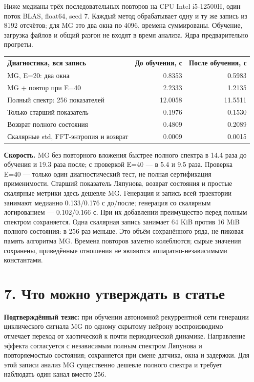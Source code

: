 \documentclass[10pt,a4paper]{article}
\begin{document}
Ниже медианы трёх последовательных повторов на CPU Intel i5-12500H, один поток BLAS, float64, seed 7. Каждый метод обрабатывает одну и ту же запись из 8192 отсчётов; для MG это два окна по 4096, времена суммированы. Обучение, загрузка файлов и общий разгон не входят в время анализа. Ядра предварительно прогреты.

\begin{center}\small
\begin{tabularx}{\linewidth}{>{\raggedright\arraybackslash}Xrr}
\toprule
Диагностика, вся запись & До обучения, с & После обучения, с \\
\midrule
MG, E=20: два окна & 0.8353 & 0.5983 \\
MG + повтор при E=40 & 2.2333 & 1.2135 \\
Полный спектр: 256 показателей & 12.0058 & 11.5511 \\
Только старший показатель & 0.1976 & 0.1530 \\
Возврат полного состояния & 0.4809 & 0.2089 \\
Скалярные std, FFT-энтропия и возврат & 0.0009 & 0.0015 \\
\bottomrule\end{tabularx}\end{center}

\textbf{Скорость.} MG без повторного вложения быстрее полного спектра в 14.4 раза до обучения и 19.3 раза после; с проверкой E=40 --- в 5.4 и 9.5 раза. Проверка E=40 --- только один диагностический тест, не полная сертификация применимости. Старший показатель Ляпунова, возврат состояния и простые скалярные метрики здесь дешевле MG. Генерация и запись всей траектории занимают медианно 0.133/0.176 с до/после; генерация со скалярным логированием --- 0.102/0.166 с. При их добавлении преимущество перед полным спектром сохраняется. Одна скалярная запись занимает 64 KiB против 16 MiB полного состояния: в 256 раз меньше. Это объём сохранённого ряда, не пиковая память алгоритма MG. Времена повторов заметно колеблются; сырые значения сохранены, приведённые отношения не являются аппаратно-независимыми константами.

\newpage

\section*{7. Что можно утверждать в статье}

\textbf{Подтверждённый тезис:} при обучении автономной рекуррентной сети генерации циклического сигнала MG по одному скрытому нейрону воспроизводимо отмечает переход от хаотической к почти периодической динамике. Направление эффекта согласуется с независимым полным спектром Ляпунова и повторяемостью состояния; сохраняется при смене датчика, окна и задержки. Для этой записи анализ MG существенно дешевле полного спектра и требует наблюдать один канал вместо 256.
\end{document}
